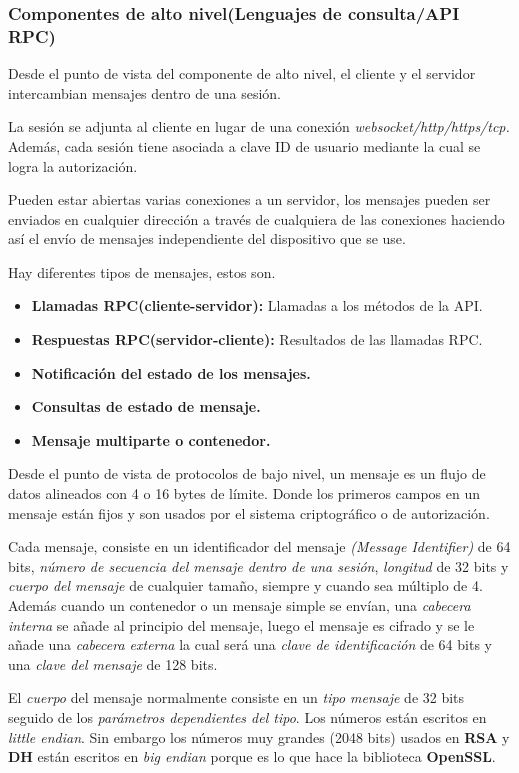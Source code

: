 \subsubsection{Componentes de alto nivel(Lenguajes de consulta/API RPC)}
Desde el punto de vista del componente de alto nivel, el cliente y el servidor intercambian mensajes dentro de una sesión.

La sesión se adjunta al cliente en lugar de una conexión \emph{websocket/http/https/tcp.} 
Además, cada sesión tiene asociada a clave ID de usuario mediante la cual se logra la autorización.

Pueden estar abiertas varias conexiones a un servidor, los mensajes pueden ser enviados en cualquier dirección a través de cualquiera de las conexiones haciendo así el envío de mensajes independiente del dispositivo que se use.

Hay diferentes tipos de mensajes, estos son.
\begin{itemize}
		\item \textbf{Llamadas RPC(cliente-servidor):} Llamadas a los métodos de la API.
		\item \textbf{Respuestas RPC(servidor-cliente):} Resultados de las llamadas RPC.
		\item \textbf{Notificación del estado de los mensajes.}
		\item \textbf{Consultas de estado de mensaje.}
		\item \textbf{Mensaje multiparte o contenedor.}
\end{itemize}
Desde el punto de vista de protocolos de bajo nivel, un mensaje es un flujo de datos alineados con 4 o 16 bytes de límite.
Donde los primeros campos en un mensaje están fijos y son usados por el sistema criptográfico o de autorización.

Cada mensaje, consiste en un identificador del mensaje \emph{(Message Identifier)} de 64 bits, \emph{número de secuencia del mensaje dentro de una sesión}, \emph{longitud} de 32 bits y \emph{cuerpo del mensaje} de cualquier tamaño, siempre y cuando sea múltiplo de 4. 
Además cuando un contenedor o un mensaje simple se envían, una \emph{cabecera interna} se añade al principio del mensaje, luego el mensaje es cifrado y se le añade una \emph{cabecera externa} la cual será una \emph{clave de identificación} de 64 bits y una \emph{clave del mensaje} de 128 bits.

El \emph{cuerpo} del mensaje normalmente consiste en un \emph{tipo mensaje} de 32 bits seguido de los \emph{parámetros dependientes del tipo}.
Los números están escritos en \emph{little endian}. Sin embargo los números muy grandes (2048 bits) usados en \textbf{RSA} y \textbf{DH} están escritos en \emph{big endian} porque es lo que hace la biblioteca \textbf{OpenSSL}.

